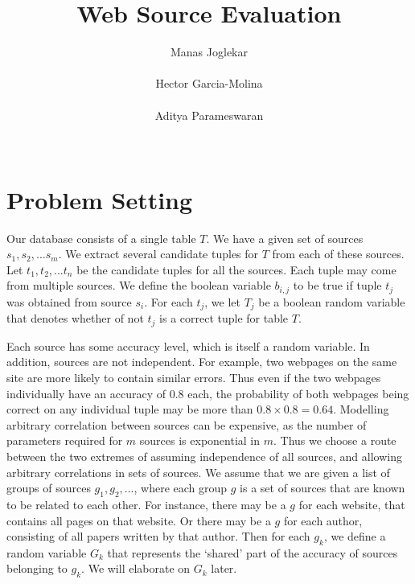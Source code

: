 \documentclass{sig-alternate}
\newcounter{prob}
\begin{document}
\title{Web Source Evaluation}
\author{
\alignauthor
Manas Joglekar\\
       \\
\alignauthor
Hector Garcia-Molina\\
       \\
\alignauthor 
Aditya Parameswaran\\
       \\
}
\maketitle

\begin{abstract}
\end{abstract}

\section{Problem Setting}
Our database consists of a single table $T$. We have a given set of sources $s_1, s_2, ... s_m$. We extract several candidate tuples for $T$ from each of these sources. Let $t_1, t_2, ... t_n$ be the candidate tuples for all the sources. Each tuple may come from multiple sources. We define the boolean variable $b_{i,j}$ to be true if tuple $t_j$ was obtained from source $s_i$. For each $t_j$, we let $T_j$ be a boolean random variable that denotes whether of not $t_j$ is a correct tuple for table $T$. 

Each source has some accuracy level, which is itself a random variable. In addition, sources are not independent. For example, two webpages on the same site are more likely to contain similar errors. Thus even if the two webpages individually have an accuracy of $0.8$ each, the probability of both webpages being correct on any individual tuple may be more than $0.8 \times 0.8 = 0.64$. Modelling arbitrary  correlation between sources can be expensive, as the number of parameters required for $m$ sources is exponential in $m$. Thus we choose a route between the two extremes of assuming independence of all sources, and allowing arbitrary correlations in sets of sources. We assume that we are given a list of groups of sources $g_1, g_2, ...$, where each group $g$ is a set of sources that are known to be related to each other. For instance, there may be a $g$ for each website, that contains all pages on that website. Or there may be a $g$ for each author, consisting of all papers written by that author. Then for each $g_k$, we define a random variable $G_k$ that represents the `shared' part of the accuracy of sources belonging to $g_k$. We will elaborate on $G_k$ later.
\end{document}
